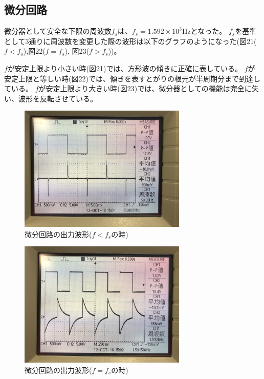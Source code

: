 \documentclass[a4paper,11pt,uplatex]{jsarticle}
\begin{document}
\subsection{微分回路}
微分器として安全な下限の周波数$f_s$は、$f_s=1.592 \times 10^3$Hzとなった。
$f_s$を基準として3通りに周波数を変更した際の波形は以下のグラフのようになった(図21($f<f_s$),図22($f=f_s$), 図23($f>f_s$))。

$f$が安定上限より小さい時(図21)では、方形波の傾きに正確に表している。
$f$が安定上限と等しい時(図22)では、傾きを表すとがりの根元が半周期分まで到達している。
$f$が安定上限より大きい時(図23)では、微分器としての機能は完全に失い、波形を反転させている。

\begin{figure}[H]
	\begin{center}
		\includegraphics[width=8cm]{画像/f<fs.jpg}
		\caption{微分回路の出力波形($f<f_s$の時)}
	\end{center}
\end{figure}

\begin{figure}[H]
	\begin{center}
		\includegraphics[width=8cm]{画像/f=fs.jpg}
		\caption{微分回路の出力波形($f=f_s$の時)}
	\end{center}
\end{figure}
\end{document}
